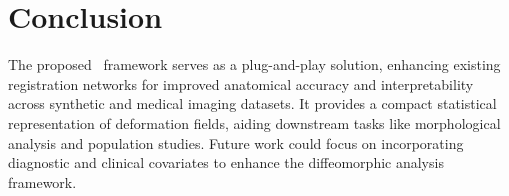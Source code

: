 \section{Conclusion}
The proposed \model~framework serves as a plug-and-play solution, enhancing existing registration networks for improved anatomical accuracy and interpretability across synthetic and medical imaging datasets. It provides a compact statistical representation of deformation fields, aiding downstream tasks like morphological analysis and population studies. Future work could focus on incorporating diagnostic and clinical covariates to enhance the diffeomorphic analysis framework.

